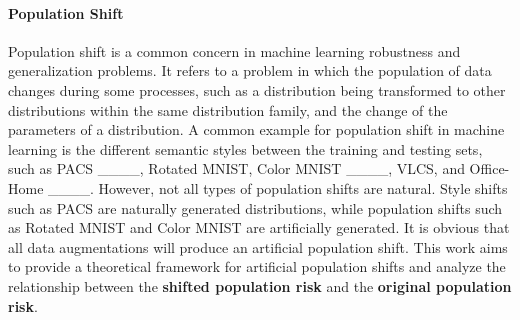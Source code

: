 \paragraph{Population Shift}
Population shift is a common concern in machine learning robustness and generalization problems. It refers to a problem in which the population of data changes during some processes, such as a distribution being transformed to other distributions within the same distribution family, and the change of the parameters of a distribution. A common example for population shift in machine learning is the different semantic styles between the training and testing sets, such as PACS ____, Rotated MNIST, Color MNIST ____, VLCS, and Office-Home ____. However, not all types of population shifts are natural. Style shifts such as PACS are naturally generated distributions, while population shifts such as Rotated MNIST and Color MNIST are artificially generated. It is obvious that all data augmentations will produce an artificial population shift. This work aims to provide a theoretical framework for artificial population shifts and analyze the relationship between the \textbf{shifted population risk} and the \textbf{original population risk}.